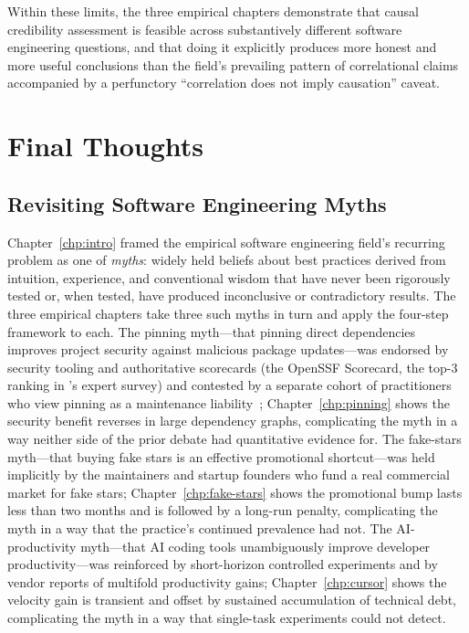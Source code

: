 Within these limits, the three empirical chapters demonstrate that causal credibility assessment is feasible across substantively different software engineering questions, and that doing it explicitly produces more honest and more useful conclusions than the field's prevailing pattern of correlational claims accompanied by a perfunctory ``correlation does not imply causation'' caveat.

\section{Final Thoughts}
\label{sec:conclusion-final-thoughts}

\subsection{Revisiting Software Engineering Myths}

Chapter~\ref{chp:intro} framed the empirical software engineering field's recurring problem as one of \emph{myths}: widely held beliefs about best practices derived from intuition, experience, and conventional wisdom that have never been rigorously tested or, when tested, have produced inconclusive or contradictory results.
The three empirical chapters take three such myths in turn and apply the four-step framework to each.
The pinning myth---that pinning direct dependencies improves project security against malicious package updates---was endorsed by security tooling and authoritative scorecards (the OpenSSF Scorecard, the top-3 ranking in \citet{DBLP:conf/sp/LadisaPMB23}'s expert survey) and contested by a separate cohort of practitioners who view pinning as a maintenance liability~\cite{DBLP:journals/tse/JafariCAST22}; Chapter~\ref{chp:pinning} shows the security benefit reverses in large dependency graphs, complicating the myth in a way neither side of the prior debate had quantitative evidence for.
The fake-stars myth---that buying fake stars is an effective promotional shortcut---was held implicitly by the maintainers and startup founders who fund a real commercial market for fake stars; Chapter~\ref{chp:fake-stars} shows the promotional bump lasts less than two months and is followed by a long-run penalty, complicating the myth in a way that the practice's continued prevalence had not.
The AI-productivity myth---that AI coding tools unambiguously improve developer productivity---was reinforced by short-horizon controlled experiments and by vendor reports of multifold productivity gains; Chapter~\ref{chp:cursor} shows the velocity gain is transient and offset by sustained accumulation of technical debt, complicating the myth in a way that single-task experiments could not detect.

